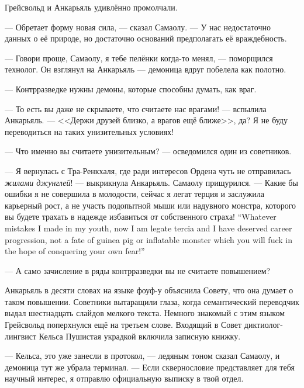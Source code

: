 Грейсвольд и Анкарьяль удивлённо промолчали.

--- Обретает форму новая сила, --- сказал Самаолу.
--- У нас недостаточно данных о её природе, но достаточно оснований предполагать её враждебность.

--- Говори проще, Самаолу, я тебе пелёнки когда-то менял, --- поморщился технолог.
Он взглянул на Анкарьяль --- демоница вдруг побелела как полотно.

--- Контрразведке нужны демоны, которые способны думать, как враг.

--- То есть вы даже не скрываете, что считаете нас врагами! --- вспылила Анкарьяль.
--- <<Держи друзей близко, а врагов ещё ближе>>, да?
Я не буду переводиться на таких унизительных условиях!

--- Что именно вы считаете унизительным? --- осведомился один из советников.

--- Я вернулась с Тра-Ренкхаля, где ради интересов Ордена чуть не отправилась \emph{жилами джунглей}! --- выкрикнула Анкарьяль.
Самаолу прищурился.
{--- Какие бы ошибки я не совершила в молодости, сейчас я легат терция и заслужила карьерный рост, а не участь подопытной мыши или надувного монстра, которого вы будете трахать в надежде избавиться от собственного страха!}
{``Whatever mistakes I made in my youth, now I am legate tercia and I have deserved career progression, not a fate of guinea pig or inflatable monster which you will fuck in the hope of conquering your own fear!''}

--- А само зачисление в ряды контрразведки вы не считаете повышением?

Анкарьяль в десяти словах на языке фоуф-у\FM{} объяснила Совету, что она думает о таком повышении.
Советники вытаращили глаза, когда семантический переводчик выдал шестнадцать слайдов мелкого текста.
Немного знакомый с этим языком Грейсвольд поперхнулся ещё на третьем слове.
Входящий в Совет диктиолог-лингвист Кельса Пушистая украдкой включила записную книжку.

--- Кельса, это уже занесли в протокол, --- ледяным тоном сказал Самаолу, и демоница тут же убрала терминал.
--- Если сквернословие представляет для тебя научный интерес, я отправлю официальную выписку в твой отдел.

